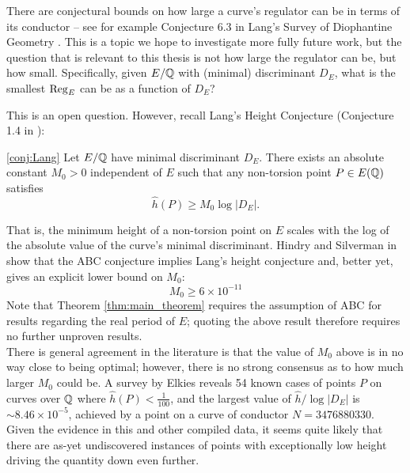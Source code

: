 There are conjectural bounds on how large a curve's regulator can be in terms of its conductor -- see for example Conjecture 6.3 in Lang's Survey of Diophantine Geometry \cite[p. 99]{Lang-1997}. This is a topic we hope to investigate more fully future work, but the question that is relevant to this thesis is not how large the regulator can be, but how small. Specifically, given $E/\mathbb{Q}$ with (minimal) discriminant $D_E$, what is the smallest $\operatorname{Reg}_E$ can be as a function of $D_E$?

This is an open question. However, recall Lang's Height Conjecture (Conjecture 1.4 in \cite[pp. 73-74]{Lang-1997}):
\begin{quotedconjecture}{\ref{conj:Lang}}
Let $E/\mathbb{Q}$ have minimal discriminant $D_E$. There exists an absolute constant $M_0 >0$ independent of $E$ such that any non-torsion point $P \in E(\mathbb{Q})$ satisfies
\begin{equation}
\hat{h}(P) \ge M_0 \log |D_E| .
\end{equation}
\end{quotedconjecture}
That is, the minimum height of a non-torsion point on $E$ scales with the log of the absolute value of the curve's minimal discriminant. Hindry and Silverman in \cite{HiS-1988} show that the ABC conjecture implies Lang's height conjecture and, better yet, gives an explicit lower bound on $M_0$:
\begin{equation}
M_0 \ge 6\times 10^{-11}
\end{equation}
Note that Theorem \ref{thm:main_theorem} requires the assumption of ABC for results regarding the real period of $E$; quoting the above result therefore requires no further unproven results. \\

There is general agreement in the literature is that the value of $M_0$ above is in no way close to being optimal; however, there is no strong consensus as to how much larger $M_0$ could be. A survey by Elkies \cite{ElSt-2002} reveals 54 known cases of points $P$ on curves over $\mathbb{Q}$ where $\hat{h}(P) < \frac{1}{100}$, and the largest value of $\hat{h}/\log|D_E|$ is $\sim 8.46 \times 10^{-5}$, achieved by a point on a curve of conductor $N=3476880330$. Given the evidence in this and other compiled data, it seems quite likely that there are as-yet undiscovered instances of points with exceptionally low height driving the quantity down even further. \\

